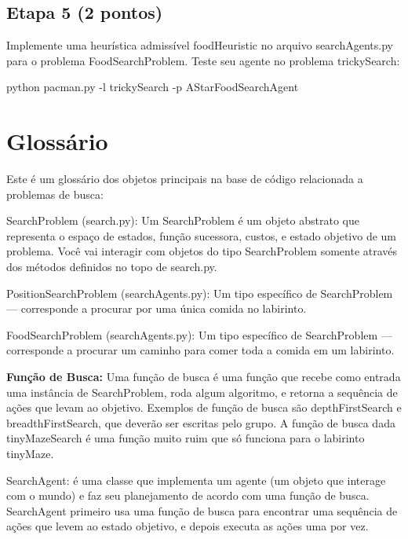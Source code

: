 \subsection*{Etapa 5 (2 pontos)}

Implemente uma heurística admissível {\ttfamily food\+Heuristic} no arquivo {\ttfamily search\+Agents.\+py} para o problema {\ttfamily Food\+Search\+Problem}. Teste seu agente no problema {\ttfamily tricky\+Search}\+:


\begin{DoxyCode}
python pacman.py -l trickySearch -p AStarFoodSearchAgent
\end{DoxyCode}
 \section*{Glossário}

Este é um glossário dos objetos principais na base de código relacionada a problemas de busca\+:


\begin{DoxyItemize}
\item {\ttfamily Search\+Problem} ({\ttfamily search.\+py})\+: Um {\ttfamily Search\+Problem} é um objeto abstrato que representa o espaço de estados, função sucessora, custos, e estado objetivo de um problema. Você vai interagir com objetos do tipo {\ttfamily Search\+Problem} somente através dos métodos definidos no topo de {\ttfamily search.\+py}.
\item {\ttfamily Position\+Search\+Problem} ({\ttfamily search\+Agents.\+py})\+: Um tipo específico de {\ttfamily Search\+Problem} --- corresponde a procurar por uma única comida no labirinto.
\item {\ttfamily Food\+Search\+Problem} ({\ttfamily search\+Agents.\+py})\+: Um tipo específico de {\ttfamily Search\+Problem} --- corresponde a procurar um caminho para comer toda a comida em um labirinto.
\item {\bfseries Função de Busca\+:} Uma função de busca é uma função que recebe como entrada uma instância de {\ttfamily Search\+Problem}, roda algum algoritmo, e retorna a sequência de ações que levam ao objetivo. Exemplos de função de busca são {\ttfamily depth\+First\+Search} e {\ttfamily breadth\+First\+Search}, que deverão ser escritas pelo grupo. A função de busca dada {\ttfamily tiny\+Maze\+Search} é uma função muito ruim que só funciona para o labirinto {\ttfamily tiny\+Maze}.
\item {\ttfamily Search\+Agent}\+: é uma classe que implementa um agente (um objeto que interage com o mundo) e faz seu planejamento de acordo com uma função de busca. {\ttfamily Search\+Agent} primeiro usa uma função de busca para encontrar uma sequência de ações que levem ao estado objetivo, e depois executa as ações uma por vez. 
\end{DoxyItemize}